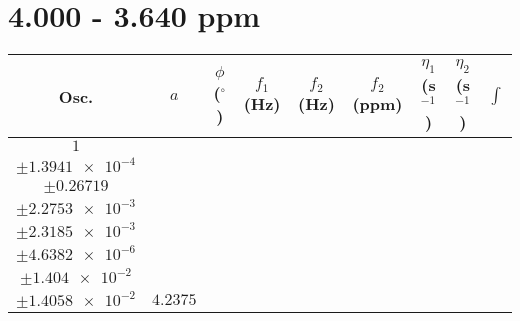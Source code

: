 \documentclass[8pt]{article}
\begin{document}
\section*{4.000 - 3.640 ppm}
\begin{longtable}[l]{c c c c c c c c c}
\toprule
Osc. & $a$ & $\phi$ ($^{\circ}$) & $f_1$ (Hz) & $f_2$ (Hz) & $f_2$ (ppm) & $\eta_1$ (s$^{-1}$) & $\eta_2$ (s$^{-1}$) & $\int$\\
\midrule
$\num{1}$ & \begin{tabular}[c]{@{}c@{}}$\num{3.0409e-2}$ \\ $\pm\num{1.3941e-4}$\end{tabular} & \begin{tabular}[c]{@{}c@{}}$\num{-2.2225e-2}$ \\ $\pm\num{0.26719}$\end{tabular} & \begin{tabular}[c]{@{}c@{}}$\num{-9.0815}$ \\ $\pm\num{2.2753e-3}$\end{tabular} & \begin{tabular}[c]{@{}c@{}}$\num{1.8485e+3}$ \\ $\pm\num{2.3185e-3}$\end{tabular} & \begin{tabular}[c]{@{}c@{}}$\num{3.698}$ \\ $\pm\num{4.6382e-6}$\end{tabular} & \begin{tabular}[c]{@{}c@{}}$\num{3.2162}$ \\ $\pm\num{1.404e-2}$\end{tabular} & \begin{tabular}[c]{@{}c@{}}$\num{3.2435}$ \\ $\pm\num{1.4058e-2}$\end{tabular} & $\num{4.2375}$\\

\end{longtable}
\end{document}
